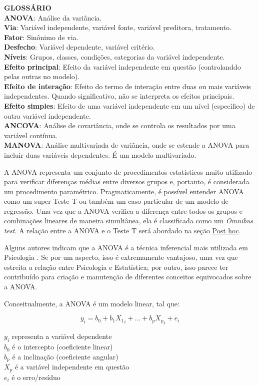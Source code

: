 \documentclass[
]{book}
\begin{document}
\textbf{GLOSSÁRIO}\\
\textbf{ANOVA}: Análise da variância.\\
\textbf{Via}: Variável independente, variável fonte, variável preditora, tratamento.\\
\textbf{Fator}: Sinônimo de via.\\
\textbf{Desfecho}: Variável dependente, variável critério.\\
\textbf{Níveis}: Grupos, classes, condições, categorias da variável independente.\\
\textbf{Efeito principal}: Efeito da variável independente em questão (controlanddo pelas outras no modelo).\\
\textbf{Efeito de interação}: Efeito do termo de interação entre duas ou mais variáveis independentes. Quando significativo, não se interpreta os efeitos principais.\\
\textbf{Efeito simples}: Efeito de uma variável independente em um nível (específico) de outra variável independente.\\
\textbf{ANCOVA}: Análise de covariância, onde se controla os resultados por uma variável contínua.\\
\textbf{MANOVA}: Análise multivariada de variância, onde se estende a ANOVA para incluir duas variáveis dependentes. É um modelo multivariado.

A ANOVA representa um conjunto de procedimentos estatísticos muito utilizado para verificar diferenças médias entre diversos grupos e, portanto, é considerada um procedimento paramétrico. Pragmaticamente, é possível entender ANOVA como um super Teste T ou também um caso particular de um modelo de regressão. Uma vez que a ANOVA verifica a diferença entre todos os grupos e combinações lineares de maneira simultânea, ela é classificada como um \emph{Omnibus test}. A relação entre a ANOVA e o Teste T será abordado na seção \protect\hyperlink{post-hoc}{Post hoc}.

Alguns autores indicam que a ANOVA é a técnica inferencial mais utilizada em Psicologia \citep{Chartier2008}. Se por um aspecto, isso é extremamente vantajoso, uma vez que estreita a relação entre Psicologia e Estatística; por outro, isso parece ter contribuído para criação e manutenção de diferentes conceitos equivocados sobre a ANOVA.

Conceitualmente, a ANOVA é um modelo linear, tal que:

\[y_i = b_0 + b_1X{_1}_i + \dots + b_pX{_p}_i + e_i\]

\(y_i\) representa a variável dependente\\
\(b_0\) é o intercepto (coeficiente linear)\\
\(b_p\) é a inclinação (coeficiente angular)\\
\(X_p\) é a variável independente em questão\\
\(e_i\) é o erro/resíduo
\end{document}
